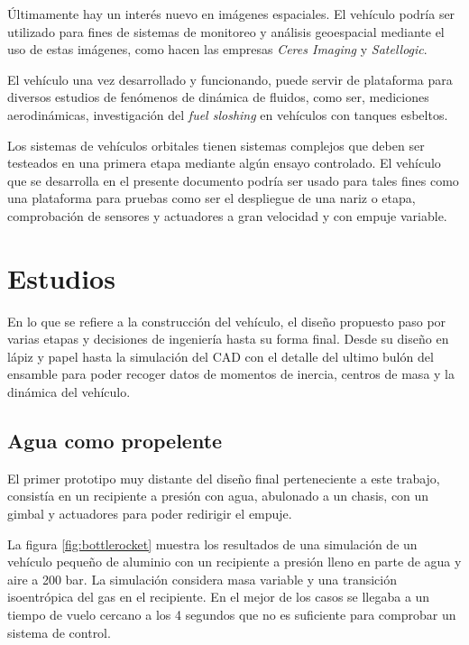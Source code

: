 \medskip

Últimamente hay un interés nuevo en imágenes espaciales. El vehículo podría ser utilizado para fines de sistemas de monitoreo y análisis geoespacial mediante el uso de estas imágenes, como hacen las empresas \textit{Ceres Imaging} y \textit{Satellogic}. %

\medskip

El vehículo una vez desarrollado y funcionando, puede servir de plataforma para diversos
estudios de fenómenos de dinámica de fluidos, como ser, mediciones aerodinámicas,
investigación del \textit{fuel sloshing} en vehículos con tanques esbeltos.

\medskip


Los sistemas de vehículos orbitales tienen sistemas complejos que deben ser testeados en una primera etapa mediante algún ensayo controlado. El vehículo que se desarrolla en el presente documento podría ser usado para tales fines como una plataforma para pruebas como ser el despliegue de una nariz o etapa, comprobación de sensores y actuadores a gran velocidad y con empuje variable.


\section{Estudios}
En lo que se refiere a la construcción del vehículo, el diseño propuesto paso por varias etapas y
decisiones de ingeniería hasta su forma final. Desde su diseño en lápiz y papel hasta la
simulación del CAD con el detalle del ultimo bulón del ensamble para poder recoger datos de
momentos de inercia, centros de masa y la dinámica del vehículo.

\subsection{Agua como propelente}\label{ssec:propAgua}
El primer prototipo muy distante del diseño final perteneciente a este trabajo, consistía en un
recipiente a presión con agua, abulonado a un chasis, con un gimbal y actuadores para poder redirigir el
empuje. 

\medskip

La figura \ref{fig:bottlerocket} muestra los resultados de una simulación de un vehículo pequeño de aluminio con un recipiente a presión lleno en parte de agua y aire a 200 bar. La simulación considera masa variable y una transición isoentrópica del gas en el recipiente. En el mejor de los casos se llegaba a un tiempo de vuelo cercano a los 4 segundos que no es suficiente para comprobar un sistema de control. 

